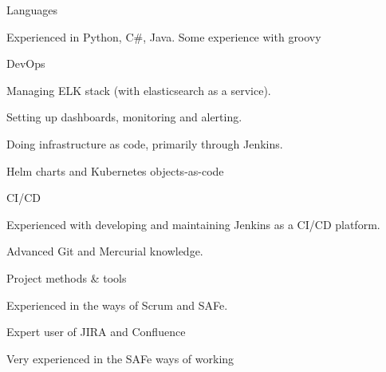 


\begin{cvskills}

\cvskill
{Languages} %
{
\begin{cvitems}
  \vspace{2mm}
\item {Experienced in Python, C\#, Java. Some experience with groovy}
\end{cvitems}
}

\cvskill
{DevOps} %
{
\begin{cvitems}
  \vspace{2mm}
\item {Managing ELK stack (with elasticsearch as a service).}
\item {Setting up dashboards, monitoring and alerting.}
\item {Doing infrastructure as code, primarily through Jenkins.}
\item {Helm charts and Kubernetes objects-as-code}
\end{cvitems}
}

\cvskill
{CI/CD} %
{
\begin{cvitems}
  \vspace{2mm}
\item {Experienced with developing and maintaining Jenkins as a CI/CD platform.}
\item {Advanced Git and Mercurial knowledge.}
\end{cvitems}
}

\cvskill
{Project methods \& tools} %
{
\begin{cvitems}
  \vspace{2mm}
\item {Experienced in the ways of Scrum and SAFe.}
\item Expert user of JIRA and Confluence
\item Very experienced in the SAFe ways of working
\end{cvitems}
}


\end{cvskills}

